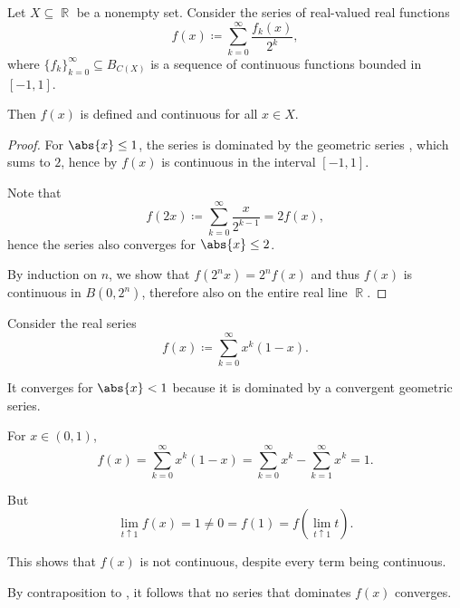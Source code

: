 \begin{corollary}\label{thm:continuous_function_series_powers_of_two}
  Let \( X \subseteq \BbbR \) be a nonempty set. Consider the series of real-valued real functions
  \begin{equation}\label{thm:continuous_function_series_powers_of_two/series}
    f(x) \coloneqq \sum_{k=0}^\infty \frac {f_k(x)} {2^k},
  \end{equation}
  where \( \{ f_k \}_{k=0}^\infty \subseteq B_{C(X)} \) is a sequence of continuous functions bounded in \( [-1, 1] \).

  Then \( f(x) \) is defined and continuous for all \( x \in X \).
\end{corollary}
\begin{proof}
  For \( \abs{x} \leq 1 \), the series is dominated by the geometric series , which sums to \( 2 \), hence by  \( f(x) \) is continuous in the interval \( [-1, 1] \).

  Note that
  \begin{equation*}
    f(2x) \coloneqq \sum_{k=0}^\infty \frac x {2^{k-1}} = 2 f(x),
  \end{equation*}
  hence the series  also converges for \( \abs{x} \leq 2 \).

  By induction on \( n \), we show that \( f(2^n x) = 2^n f(x) \) and thus \( f(x) \) is continuous in \( B(0, 2^n) \), therefore also on the entire real line \( \BbbR \).
\end{proof}

\begin{example}\label{thm:weierstrass_series_criterion/counterexample}
  Consider the real series
  \begin{equation*}
    f(x) \coloneqq \sum_{k=0}^\infty x^k (1 - x).
  \end{equation*}

  It converges for \( \abs{x} < 1 \) because it is dominated by a convergent geometric series.

  For \( x \in (0, 1) \),
  \begin{equation*}
    f(x)
    =
    \sum_{k=0}^\infty x^k (1 - x)
    =
    \sum_{k=0}^\infty x^k - \sum_{k=1}^\infty x^k
    =
    1.
  \end{equation*}

  But
  \begin{equation*}
    \lim_{t \uparrow 1} f(x) = 1 \neq 0 = f(1) = f(\lim_{t \uparrow 1} t).
  \end{equation*}

  This shows that \( f(x) \) is not continuous, despite every term being continuous.

  By contraposition to , it follows that no series that dominates \( f(x) \) converges.
\end{example}

